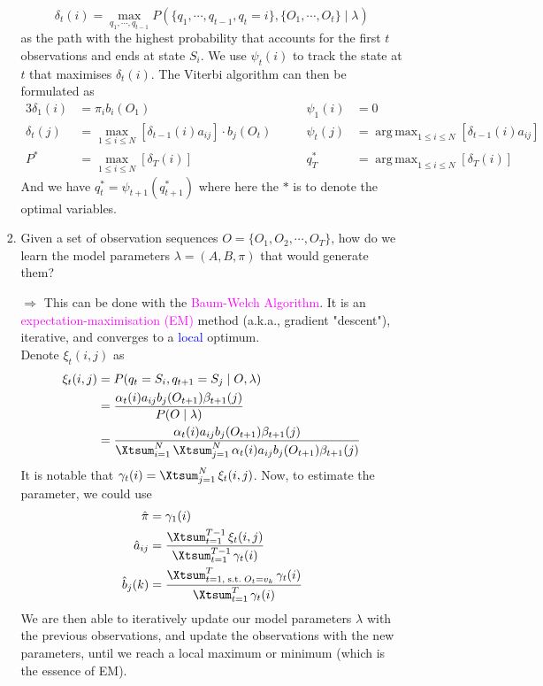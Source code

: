 \documentclass[UTF8]{book}
\DeclareMathOperator*{\argmax}{arg\,max}
\DeclareMathOperator*{\Xsum}{\mathchoice{\Xdsum}{\Xtsum}{\Xtsum}{\Xtsum}}
\newcommand{\et}{&}
\newcommand{\concept}[1]{\textcolor{magenta}{#1}}
\renewcommand{\emph}[1]{\textcolor{blue}{#1}}
\begin{document}
\begin{itemize}
\begin{itemize}
\begin{enumerate}
		$$
		\delta_t(i) = \max_{q_1,\cdots,q_{t-1}}P(\{q_1,\cdots,q_{t-1},q_t=i\},\{O_1,\cdots,O_t\}\mid\lambda)
		$$
		as the path with the highest probability that accounts for the first $t$ observations and ends at state $S_i$. We use $\psi_t(i)$ to track the state at $t$ that maximises $\delta_t(i)$. The Viterbi algorithm can then be formulated as 
		\begin{alignat*}{3}
			\delta_1(i) &= \pi_i b_i (O_1) &\psi_1(i) & = 0 \\
			\delta_t(j) & = \max_{1\leq i\leq N}[\delta_{t-1}(i)a_{ij}]\cdot b_j(O_t)  \qquad & \psi_t(j) & = \argmax_{1\leq i\leq N}[\delta_{t-1}(i)a_{ij}]\\
			P^* \et = \max_{1\leq i\leq N}[\delta_T(i)] \et q_T^* \et = \argmax_{1\leq i\leq N}[\delta_T(i)]
		\end{alignat*}
		And we have $q_t^*=\psi_{t+1}(q^*_{t+1})$ where here the $*$ is to denote the optimal variables.
		\item Given a set of observation sequences $O = \{O_1,O_2,\cdots,O_T\}$, how do we learn the model parameters $\lambda = (A,B,\pi)$ that would generate them?
		\item[$\Rightarrow$]	This can be done with the \concept{Baum-Welch Algorithm}. It is an \concept{expectation-maximisation (EM)} method (a.k.a., gradient "descent"), iterative, and converges to a \emph{local} optimum. \\
		Denote $\xi_t(i,j)$ as
		\begin{align*}
		\xi_t(i,j) \et = P(q_t = S_i, q_{t+1} = S_j\mid O,\lambda)\\
		\et = \dfrac{\alpha_t(i)a_{ij}b_j(O_{t+1})\beta_{t+1}(j)}{P(O\mid\lambda)}\\
		\et = \dfrac{\alpha_t(i)a_{ij}b_j(O_{t+1})\beta_{t+1}(j)}{\Xsum_{i=1}^N\Xsum_{j=1}^N\alpha_t(i)a_{ij}b_j(O_{t+1})\beta_{t+1}(j)}
		\end{align*}
		It is notable that $\gamma_t(i) = \Xsum_{j=1}^N\xi_t(i,j)$. Now, to estimate the parameter, we could use
		\begin{align*}
			\hat{\pi} \et = \gamma_1(i)\\
			\hat{a}_{ij} \et = \dfrac{\Xsum_{t=1}^{T-1}\xi_t(i,j)}{\Xsum_{t=1}^{T-1}\gamma_t(i)}\\
			\hat{b}_j(k) \et = \dfrac{\Xsum^T_{t=1, \mathrm{\; s.t.\;}O_t=v_k}\gamma_t(i)}{\Xsum_{t=1}^T\gamma_t(i)}
		\end{align*}
		We are then able to iteratively update our model parameters $\lambda$ with the previous observations, and update the observations with the new parameters, until we reach a local maximum or minimum (which is the essence of EM).
	\end{enumerate}
\end{itemize}
\end{itemize}
\end{document}
